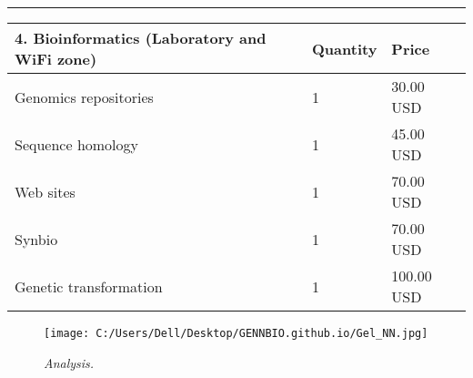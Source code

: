 \documentclass[
]{article}
\begin{document}
\begin{center}\rule{0.5\linewidth}{0.5pt}\end{center}

\begin{longtable}[]{@{}lll@{}}
\toprule
4. Bioinformatics (Laboratory and WiFi zone) & Quantity & Price \\
\midrule
\endhead
Genomics repositories & 1 & 30.00 USD \\
Sequence homology & 1 & 45.00 USD \\
Web sites & 1 & 70.00 USD \\
Synbio & 1 & 70.00 USD \\
Genetic transformation & 1 & 100.00 USD \\
\bottomrule
\end{longtable}

\begin{figure}
\centering
\texttt{[image: C:/Users/Dell/Desktop/GENNBIO.github.io/Gel\_NN.jpg]}
\caption{\emph{Analysis.}}
\end{figure}


\end{document}
